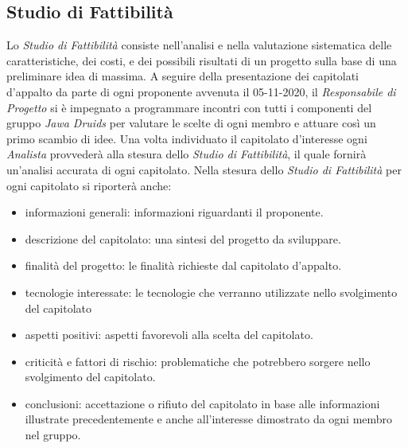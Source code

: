 \subsection{Studio di Fattibilità}
Lo \emph{Studio di Fattibilità} consiste nell'analisi e nella valutazione sistematica delle caratteristiche, dei costi, e dei possibili risultati di un progetto sulla base di una preliminare idea di massima.
A seguire della presentazione dei capitolati d'appalto da parte di ogni proponente avvenuta il 05-11-2020, il \emph{Responsabile di Progetto} si è impegnato a programmare incontri con tutti i componenti del gruppo \emph{Jawa Druids} per valutare le scelte di ogni membro e attuare così un primo scambio di idee. Una volta individuato il capitolato d'interesse ogni \emph{Analista} provvederà alla stesura dello \emph{Studio di Fattibilità}, il quale fornirà un'analisi accurata di ogni capitolato.
Nella stesura dello \emph{Studio di Fattibilità} per ogni capitolato si riporterà anche:
\begin{itemize}
	\item informazioni generali: informazioni riguardanti il proponente.
	\item descrizione del capitolato: una sintesi del progetto da sviluppare. 
	\item finalità del progetto: le finalità richieste dal capitolato d'appalto.
	\item tecnologie interessate: le tecnologie che verranno utilizzate nello svolgimento del capitolato
	\item aspetti positivi: aspetti favorevoli alla scelta del capitolato.
	\item criticità e fattori di rischio: problematiche che potrebbero sorgere nello svolgimento del capitolato.
	\item conclusioni: accettazione o rifiuto del capitolato in base alle informazioni illustrate precedentemente e anche all'interesse dimostrato da ogni membro nel gruppo.
\end{itemize}
